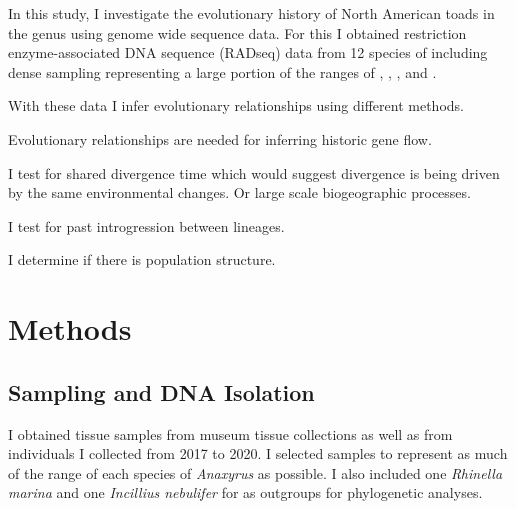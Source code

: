 In this study, I investigate the evolutionary history of North American
toads in the genus \anaxyrus using genome wide sequence data. 
For this I obtained restriction enzyme-associated DNA sequence (RADseq) data
from 12 species of \anaxyrus including dense sampling representing a 
large portion of the ranges of \amer, \fowl, \terr, and \wood.

With these data I infer evolutionary relationships using different methods.

Evolutionary relationships are needed for inferring historic gene flow.

I test for shared divergence time which would suggest divergence is being driven
by the same environmental changes. Or large scale biogeographic processes.

I test for past introgression between lineages.

I determine if there is population structure. 






\section{Methods}
\subsection{Sampling and DNA Isolation}
I obtained tissue samples from museum tissue collections as well as from individuals   
I collected from 2017 to 2020. I selected samples to represent as much
of the range of each species of \textit{Anaxyrus} as possible.
I also included one \textit{Rhinella marina} and one \textit{Incillius nebulifer} 
for as outgroups for phylogenetic analyses.

